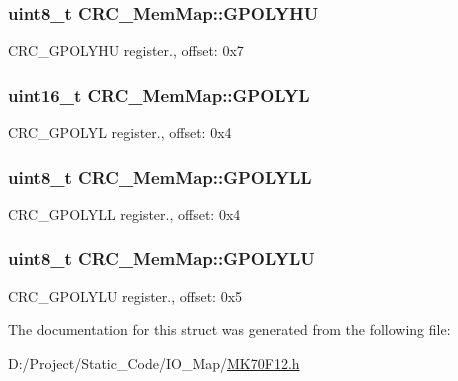 \subsubsection[{G\+P\+O\+L\+Y\+H\+U}]{\setlength{\rightskip}{0pt plus 5cm}uint8\+\_\+t C\+R\+C\+\_\+\+Mem\+Map\+::\+G\+P\+O\+L\+Y\+H\+U}\label{struct_c_r_c___mem_map_ae7c166006427c82d21b88417313cf511}
C\+R\+C\+\_\+\+G\+P\+O\+L\+Y\+H\+U register., offset\+: 0x7 \hypertarget{struct_c_r_c___mem_map_a4cd3b43b213defbaa07381a32b24af67}{}
\subsubsection[{G\+P\+O\+L\+Y\+L}]{\setlength{\rightskip}{0pt plus 5cm}uint16\+\_\+t C\+R\+C\+\_\+\+Mem\+Map\+::\+G\+P\+O\+L\+Y\+L}\label{struct_c_r_c___mem_map_a4cd3b43b213defbaa07381a32b24af67}
C\+R\+C\+\_\+\+G\+P\+O\+L\+Y\+L register., offset\+: 0x4 \hypertarget{struct_c_r_c___mem_map_afefe4288aecf5a31ca6f6d64317eeb4b}{}
\subsubsection[{G\+P\+O\+L\+Y\+L\+L}]{\setlength{\rightskip}{0pt plus 5cm}uint8\+\_\+t C\+R\+C\+\_\+\+Mem\+Map\+::\+G\+P\+O\+L\+Y\+L\+L}\label{struct_c_r_c___mem_map_afefe4288aecf5a31ca6f6d64317eeb4b}
C\+R\+C\+\_\+\+G\+P\+O\+L\+Y\+L\+L register., offset\+: 0x4 \hypertarget{struct_c_r_c___mem_map_a0ba8bc9ddb8de4ca001f205f32cdd626}{}
\subsubsection[{G\+P\+O\+L\+Y\+L\+U}]{\setlength{\rightskip}{0pt plus 5cm}uint8\+\_\+t C\+R\+C\+\_\+\+Mem\+Map\+::\+G\+P\+O\+L\+Y\+L\+U}\label{struct_c_r_c___mem_map_a0ba8bc9ddb8de4ca001f205f32cdd626}
C\+R\+C\+\_\+\+G\+P\+O\+L\+Y\+L\+U register., offset\+: 0x5 

The documentation for this struct was generated from the following file\+:\begin{DoxyCompactItemize}
\item 
D\+:/\+Project/\+Static\+\_\+\+Code/\+I\+O\+\_\+\+Map/\hyperlink{_m_k70_f12_8h}{M\+K70\+F12.\+h}\end{DoxyCompactItemize}
